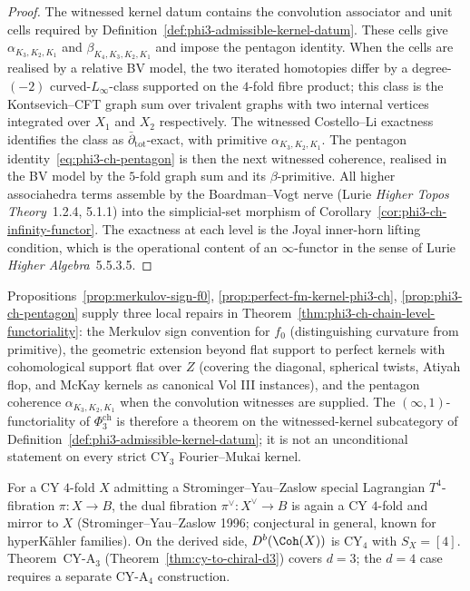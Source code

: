 \begin{proof}
The witnessed kernel datum contains the convolution associator and unit
cells required by Definition~\ref{def:phi3-admissible-kernel-datum}.
These cells give $\alpha_{K_3,K_2,K_1}$ and
$\beta_{K_4,K_3,K_2,K_1}$ and impose the pentagon identity. When the
cells are realised by a relative BV model, the two iterated homotopies
differ by a degree-$(-2)$ curved-$L_\infty$-class supported on the
$4$-fold fibre product; this class is the Kontsevich--CFT graph sum over
trivalent graphs with two internal vertices integrated over $X_1$ and
$X_2$ respectively. The witnessed Costello--Li exactness identifies
the class as $\bar\partial_{\mathrm{tot}}$-exact, with primitive
$\alpha_{K_3,K_2,K_1}$. The pentagon identity~\eqref{eq:phi3-ch-pentagon}
is then the next witnessed coherence, realised in the BV model by the
$5$-fold graph sum and its $\beta$-primitive. All higher associahedra
terms assemble by the Boardman--Vogt nerve (Lurie \textit{Higher Topos
Theory}~1.2.4, 5.1.1) into the simplicial-set morphism of
Corollary~\ref{cor:phi3-ch-infinity-functor}. The exactness at each
level is the Joyal inner-horn lifting condition, which is the operational
content of an $\infty$-functor in the sense of Lurie \textit{Higher
Algebra}~5.5.3.5.
\end{proof}

\begin{remark}
\label{rem:phi3-ch-witnessed-kernel-local-repairs}
Propositions~\ref{prop:merkulov-sign-f0}, \ref{prop:perfect-fm-kernel-phi3-ch}, \ref{prop:phi3-ch-pentagon} supply three local repairs in Theorem~\ref{thm:phi3-ch-chain-level-functoriality}: the Merkulov sign convention for $f_0$ (distinguishing curvature from primitive), the geometric extension beyond flat support to perfect kernels with cohomological support flat over $Z$ (covering the diagonal, spherical twists, Atiyah flop, and McKay kernels as canonical Vol III instances), and the pentagon coherence $\alpha_{K_3, K_2, K_1}$ when the convolution witnesses are supplied. The $(\infty,1)$-functoriality of $\Phi_3^{\mathrm{ch}}$ is therefore a theorem on the witnessed-kernel subcategory of Definition~\ref{def:phi3-admissible-kernel-datum}; it is not an unconditional statement on every strict CY$_3$ Fourier--Mukai kernel.
\end{remark}

\begin{example}
\label{ex:cy4-syz}
For a CY $4$-fold $X$ admitting a Strominger--Yau--Zaslow special Lagrangian $T^4$-fibration $\pi \colon X \to B$, the dual fibration $\pi^\vee \colon X^\vee \to B$ is again a CY $4$-fold and mirror to $X$ (Strominger--Yau--Zaslow 1996; conjectural in general, known for hyperK\"ahler families). On the derived side, $D^b(\Coh(X))$ is CY$_4$ with $S_X = [4]$. Theorem~CY-A$_3$ (Theorem~\ref{thm:cy-to-chiral-d3}) covers $d = 3$; the $d = 4$ case requires a separate CY-A$_4$ construction.
\end{example}

